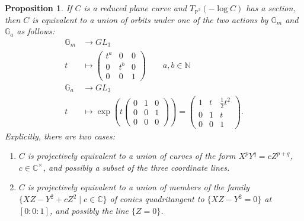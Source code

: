 \documentclass[11pt,reqno]{amsart}
\theoremstyle{plain}
\newtheorem{proposition}[theorem]{Proposition}
\theoremstyle{definition}
\theoremstyle{remark}
\numberwithin{equation}{section}
\renewcommand{\to}{{\longrightarrow}}
\numberwithin{equation}{section}
\newcommand{\PP}{\mathbb{P}}
\begin{document}
\begin{proposition}
\label{integralcurve}
If $C$ is a reduced plane curve and $T_{\PP^2}(-\log C)$ has a section, then $C$ is equivalent to a union of orbits under one of the  two actions by $\mathbb{G}_m$ and $\mathbb{G}_a$ as follows:
\begin{align*}
    \mathbb{G}_m &\to GL_3\\
    t &\mapsto \begin{pmatrix} t^a & 0 & 0\\ 0 & t^b & 0 \\ 0 & 0 & 1\end{pmatrix} \qquad a,b\in\mathbb{N} \\
       \mathbb{G}_a&\to GL_3\\
    t&\mapsto \operatorname{exp}\left(t\begin{pmatrix} 0 & 1 & 0\\ 0 & 0 & 1\\ 0 & 0 & 0\end{pmatrix}\right) =\begin{pmatrix} 1 & t & \frac{1}{2}t^2\\ 0 & 1 & t \\ 0 & 0 & 1\end{pmatrix}.
\end{align*}
Explicitly, there are two cases:
\begin{enumerate}
    \item $C$ is projectively equivalent to a union of curves of the form $X^{p} Y^{q}=cZ^{p+q}$, $c\in \mathbb{C}^{\times}$, and possibly a subset of the three coordinate lines.
    \item $C$ is projectively equivalent to a union of members of the family $\{XZ-Y^2+cZ^2\mid c\in \mathbb{C}\}$ of conics quadritangent to $\{XZ-Y^2=0\}$ at $[0:0:1]$, and possibly the line $\{Z=0\}$.
\end{enumerate}
\end{proposition}
\end{document}
